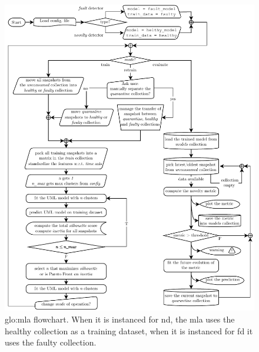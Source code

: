 \begin{figure}[htbp]
    \centering
    \includegraphics[width=\textwidth]{images/Framework/MLA.pdf}
    \caption{\gls{glo:mla} flowchart. When it is instanced for \gls{nd}, the \gls{mla} uses the healthy collection as a training dataset, when it is instanced for \gls{fd} it uses the faulty collection.}
    \label{fig:MLA_structure}
\end{figure}


